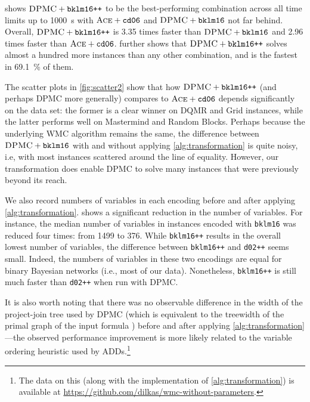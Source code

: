  shows $\textsc{DPMC}+\texttt{bklm16++}$ to be the
best-performing combination across all time limits up to \SI{1000}{\second} with
$\textsc{Ace} + \texttt{cd06}$ and $\textsc{DPMC}+\texttt{bklm16}$ not far
behind. Overall, $\textsc{DPMC}+\texttt{bklm16++}$ is 3.35 times faster than
$\textsc{DPMC}+\texttt{bklm16}$ and 2.96 times faster than
$\textsc{Ace}+\texttt{cd06}$.  further shows that
$\textsc{DPMC}+\texttt{bklm16++}$ solves almost a hundred more instances than
any other combination, and is the fastest in \SI{69.1}{\percent} of them.

The scatter plots in \cref{fig:scatter2} show that how $\textsc{DPMC} +
\texttt{bklm16++}$ (and perhaps \textsc{DPMC} more generally) compares to
$\textsc{Ace} + \texttt{cd06}$ depends significantly on the data set: the former
is a clear winner on DQMR and Grid instances, while the latter performs well on
Mastermind and Random Blocks. Perhaps because the underlying WMC algorithm
remains the same, the difference between $\textsc{DPMC} + \texttt{bklm16}$ with
and without applying \cref{alg:transformation} is quite noisy, i.e, with most
instances scattered around the line of equality. However, our transformation
does enable \textsc{DPMC} to solve many instances that were previously beyond
its reach.

We also record numbers of variables in each encoding before and after applying
\cref{alg:transformation}.  shows a significant reduction in the
number of variables. For instance, the median number of variables in instances
encoded with \texttt{bklm16} was reduced four times: from 1499 to 376. While
\texttt{bklm16++} results in the overall lowest number of variables, the
difference between \texttt{bklm16++} and \texttt{d02++} seems small. Indeed, the
numbers of variables in these two encodings are equal for binary Bayesian
networks (i.e., most of our data). Nonetheless, \texttt{bklm16++} is still much
faster than \texttt{d02++} when run with \textsc{DPMC}.

It is also worth noting that there was no observable difference in the width of
the project-join tree used by \textsc{DPMC} (which is equivalent to the
treewidth of the primal graph of the input formula
\citep{DBLP:conf/cp/DudekPV20}) before and after applying
\cref{alg:transformation}---the observed performance improvement is more likely
related to the variable ordering heuristic used by ADDs.\footnote{The data on
  this (along with the implementation of \cref{alg:transformation}) is available
  at \url{https://github.com/dilkas/wmc-without-parameters}.}

